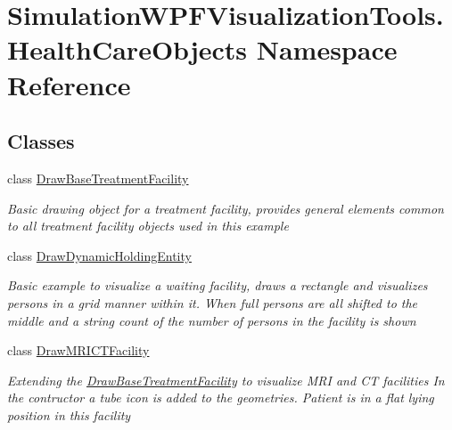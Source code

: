 \hypertarget{namespace_simulation_w_p_f_visualization_tools_1_1_health_care_objects}{}\section{Simulation\+W\+P\+F\+Visualization\+Tools.\+Health\+Care\+Objects Namespace Reference}
\label{namespace_simulation_w_p_f_visualization_tools_1_1_health_care_objects}
\subsection*{Classes}
\begin{DoxyCompactItemize}
\item 
class \hyperlink{class_simulation_w_p_f_visualization_tools_1_1_health_care_objects_1_1_draw_base_treatment_facility}{Draw\+Base\+Treatment\+Facility}
\begin{DoxyCompactList}\small\item\em Basic drawing object for a treatment facility, provides general elements common to all treatment facility objects used in this example \end{DoxyCompactList}\item 
class \hyperlink{class_simulation_w_p_f_visualization_tools_1_1_health_care_objects_1_1_draw_dynamic_holding_entity}{Draw\+Dynamic\+Holding\+Entity}
\begin{DoxyCompactList}\small\item\em Basic example to visualize a waiting facility, draws a rectangle and visualizes persons in a grid manner within it. When full persons are all shifted to the middle and a string count of the number of persons in the facility is shown \end{DoxyCompactList}\item 
class \hyperlink{class_simulation_w_p_f_visualization_tools_1_1_health_care_objects_1_1_draw_m_r_i_c_t_facility}{Draw\+M\+R\+I\+C\+T\+Facility}
\begin{DoxyCompactList}\small\item\em Extending the \hyperlink{class_simulation_w_p_f_visualization_tools_1_1_health_care_objects_1_1_draw_base_treatment_facility}{Draw\+Base\+Treatment\+Facility} to visualize M\+RI and CT facilities In the contructor a tube icon is added to the geometries. Patient is in a flat lying position in this facility \end{DoxyCompactList}\item 

\end{DoxyCompactItemize}
